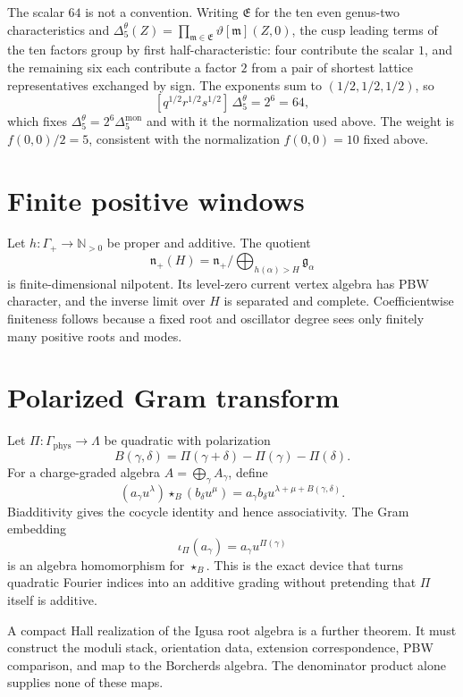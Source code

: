 The scalar \(64\) is not a convention.  Writing \(\mathfrak E\) for the ten
even genus-two characteristics and
\(\Delta_5^{\theta}(Z)=\prod_{\mathfrak m\in\mathfrak E}\vartheta[\mathfrak m](Z,0)\),
the cusp leading terms of the ten factors group by first half-characteristic:
four contribute the scalar \(1\), and the remaining six each contribute a
factor \(2\) from a pair of shortest lattice representatives exchanged by
sign.  The exponents sum to \((1/2,1/2,1/2)\), so
\[
 [q^{1/2}r^{1/2}s^{1/2}]\,\Delta_5^{\theta}=2^6=64,
\]
which fixes \(\Delta_5^{\theta}=2^6\Delta_5^{\mathrm{mon}}\) and with it the
normalization used above. The weight is
\(f(0,0)/2=5\), consistent with the normalization \(f(0,0)=10\) fixed above.

\section{Finite positive windows}
Let \(h:\Gamma_+\to\mathbb N_{>0}\) be proper and additive.  The quotient
\[
 \mathfrak n_+(H)=\mathfrak n_+/\bigoplus_{h(\alpha)>H}\mathfrak g_\alpha
\]
is finite-dimensional nilpotent.  Its level-zero current vertex algebra has PBW character, and the inverse limit over \(H\) is separated and complete.  Coefficientwise finiteness follows because a fixed root and oscillator degree sees only finitely many positive roots and modes.

\section{Polarized Gram transform}
Let \(\Pi:\Gamma_{\mathrm{phys}}\to\Lambda\) be quadratic with polarization
\[
 B(\gamma,\delta)=\Pi(\gamma+\delta)-\Pi(\gamma)-\Pi(\delta).
\]
For a charge-graded algebra \(A=\bigoplus_\gamma A_\gamma\), define
\[
 (a_\gamma u^\lambda)\star_B(b_\delta u^\mu)
 =a_\gamma b_\delta u^{\lambda+\mu+B(\gamma,\delta)}.
\]
Biadditivity gives the cocycle identity and hence associativity.  The Gram embedding
\[
 \iota_\Pi(a_\gamma)=a_\gamma u^{\Pi(\gamma)}
\]
is an algebra homomorphism for \(\star_B\).  This is the exact device that turns quadratic Fourier indices into an additive grading without pretending that \(\Pi\) itself is additive.

\begin{warning}
A compact Hall realization of the Igusa root algebra is a further theorem.  It must construct the moduli stack, orientation data, extension correspondence, PBW comparison, and map to the Borcherds algebra.  The denominator product alone supplies none of these maps.
\end{warning}


